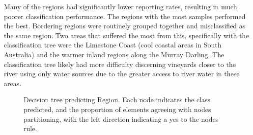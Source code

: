 \documentclass[review,12pt,authoryear]{elsarticle}
\begin{document}
\begin{linenumbers}
Many of the regions had significantly lower reporting rates, resulting in much poorer classification performance. The regions with the most samples performed the best. Bordering regions were routinely grouped together and misclassified as the same region. Two areas that suffered the most from this, specifically with the classification tree were the Limestone Coast (cool coastal areas in South Australia) and the warmer inland regions along the Murray Darling. The classification tree likely had more difficulty discerning vineyards closer to the river using only water sources due to the greater access to river water in these areas.

\begin{figure}
 \caption{Decision tree predicting Region. Each node indicates the class predicted, and the proportion of elements agreeing with nodes partitioning, with the left direction indicating a yes to the nodes rule.}\label{fig:region_tree}
\end{figure}


\end{linenumbers}
\end{document}
